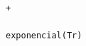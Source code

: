 \documentclass[10pt,a4paper]{article} %
\begin{document}
\begin{lstlisting}
                                                                                                                                                                                                                                                                                                                                                                                                                                                                                                                                                                                                                                                                                                                                                                                                                                                                                                                                                                                                                                                                                                                                                            +
                                                                                                                                                                                                                                                                                                                                                                                                                                                                                                                                                                                                                                                                                                                                                                                                                                                                                                                                                                                                                                                                                                                                                            exponencial(Tr)

\end{lstlisting}
\end{document}
